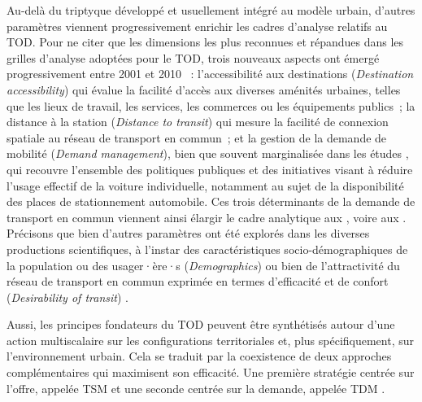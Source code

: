 \begin{refsegment}
Au-delà du triptyque développé et usuellement intégré au modèle urbain, d’autres paramètres viennent progressivement enrichir les cadres d’analyse relatifs au \acrshort{TOD}. Pour ne citer que les dimensions les plus reconnues et répandues dans les grilles d'analyse adoptées pour le \acrshort{TOD}, trois nouveaux aspects ont émergé progressivement entre 2001 et 2010 \textcolor{blue}{\autocite[267]{ewing_travel_2010}}~: l'accessibilité aux destinations (\textsl{Destination accessibility}) qui évalue la facilité d’accès aux diverses aménités urbaines, telles que les lieux de travail, les services, les commerces ou les équipements publics~; la distance à la station (\textsl{Distance to transit}) qui mesure la facilité de connexion spatiale au réseau de transport en commun~; et la gestion de la demande de mobilité (\textsl{Demand management}), bien que souvent marginalisée dans les études \textcolor{blue}{\autocite[267]{ewing_travel_2010}}, qui recouvre l’ensemble des politiques publiques et des initiatives visant à réduire l'usage effectif de la voiture individuelle, notamment au sujet de la disponibilité des places de stationnement automobile. Ces trois déterminants de la demande de transport en commun viennent ainsi élargir le cadre analytique aux , voire aux  \textcolor{blue}{\autocite[4-6]{thomas_transit-oriented_2020}}. Précisons que bien d'autres paramètres ont été explorés dans les diverses productions scientifiques, à l'instar des caractéristiques socio-démographiques de la population ou des usager·ère·s (\textsl{Demographics}) \textcolor{blue}{\autocite[75]{ewing_trip_2017}} ou bien de l'attractivité du réseau de transport en commun exprimée en termes d'efficacité et de confort (\textsl{Desirability of transit}) \textcolor{blue}{\autocite[8]{mangu_evaluation_2025}}.%

Aussi, les principes fondateurs du \acrshort{TOD} peuvent être synthétisés autour d’une action multiscalaire sur les configurations territoriales et, plus spécifiquement, sur l’environnement urbain. Cela se traduit par la coexistence de deux approches complémentaires qui maximisent son efficacité. Une première stratégie centrée sur l'offre, appelée \acrfull{TSM} et une seconde centrée sur la demande, appelée \acrfull{TDM} \textcolor{blue}{\autocite[67]{cervero_transit_1998}}.


\end{refsegment}
